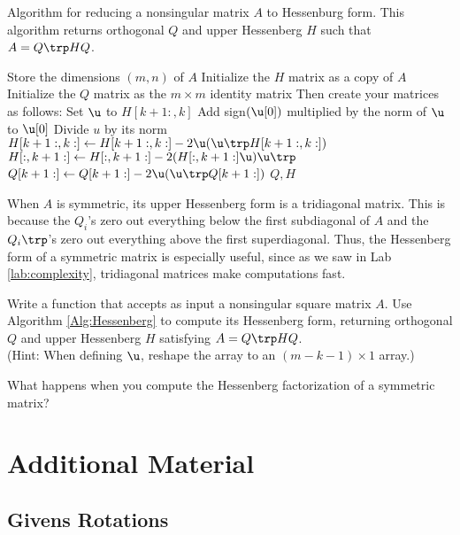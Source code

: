\begin{algorithm}
\caption{Algorithm for reducing a nonsingular matrix $A$ to Hessenburg form.
This algorithm returns orthogonal $Q$ and upper Hessenberg $H$ such that $A = Q\trp HQ$.}
\label{Alg:Hessenberg}
\begin{algorithmic}[1]
\State Store the dimensions $(m,n)$ of $A$
\State Initialize the $H$ matrix as a copy of $A$
\State Initialize the $Q$ matrix as the $m\times m$ identity matrix
\State Then create your matrices as follows:
    \State Set $\u$ to $H[k+1:, k]$ %
    \State Add sign$(\u[0])$ multiplied by the norm of $\u$ to $\u[0]$
    \State Divide $u$ by its norm
    \State $H[k+1:,k:] \gets H[k+1:,k:] - 2\u(\u\trp H[k+1:,k:])$
    \State $H[:,k+1:] \gets H[:,k+1:] - 2(H[:,k+1:] \u) \u\trp$
    \State $Q[k+1:] \gets Q[k+1:] - 2\u(\u\trp Q[k+1:])$
\EndFor
\State {} $Q, H$
\EndProcedure
\end{algorithmic}
\end{algorithm}

When $A$ is symmetric, its upper Hessenberg form is a tridiagonal matrix.
This is because the $Q_i$'s zero out everything below the first subdiagonal of $A$ and the $Q_i\trp$'s zero out everything above the first superdiagonal.
Thus, the Hessenberg form of a symmetric matrix is especially useful, since as we saw in Lab \ref{lab:complexity}, tridiagonal matrices make computations fast.

\begin{problem} %
Write a function that accepts as input a nonsingular square matrix $A$.
Use Algorithm \ref{Alg:Hessenberg} to compute its Hessenberg form, returning orthogonal $Q$ and upper Hessenberg $H$ satisfying $A = Q\trp HQ$.
\\
(Hint: When defining $\u$, reshape the array to an $(m-k-1) \times 1$ array.)

What happens when you compute the Hessenberg factorization of a symmetric matrix?
\end{problem}

\newpage

\section*{Additional Material} %

\subsection*{Givens Rotations} %

